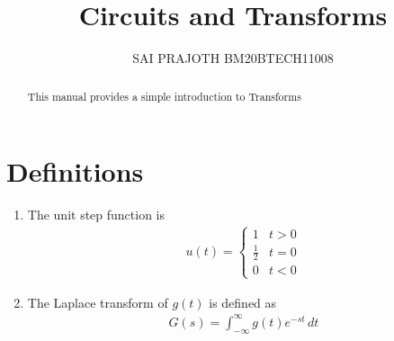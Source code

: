 \documentclass[journal,12pt,twocolumn]{IEEEtran}
\renewcommand\thesection{\arabic{section}}
\begin{document}
	\let\StandardTheFigure\thefigure
	\renewcommand{\thefigure}{\theproblem}
	\renewcommand{\thefigure}{\arabic{section}.\arabic{figure}}
	\makeatletter
	\makeatother
	
	
	\def\putbox#1#2#3{\makebox[0in][l]{\makebox[#1][l]{}\raisebox{\baselineskip}[0in][0in]{\raisebox{#2}[0in][0in]{#3}}}}
	\def\rightbox#1{\makebox[0in][r]{#1}}
	\def\centbox#1{\makebox[0in]{#1}}
	\def\topbox#1{\raisebox{-\baselineskip}[0in][0in]{#1}}
	\def\midbox#1{\raisebox{-0.5\baselineskip}[0in][0in]{#1}}
	
	\vspace{3cm}
	
	\title{ 
		Circuits and Transforms
	}
	
	\author{SAI PRAJOTH BM20BTECH11008}
	
	\maketitle
	
	
	\tableofcontents
	
	
	\renewcommand{\thefigure}{\theenumi}
	\renewcommand{\thetable}{\theenumi}
	
	
	
	\bigskip
	
	\begin{abstract}
		This manual provides a simple introduction to Transforms
	\end{abstract}
	
	\section{Definitions}
	\begin{enumerate}[label=\arabic*.,ref=\thesection.\theenumi]
		\item The unit step function is 
		\begin{align}
			u(t) =
			\begin{cases}
				1 & t > 0
				\\
				\frac{1}{2} & t = 0
				\\
				0 & t < 0
			\end{cases}
		\end{align}
		\item The Laplace transform of $g(t)$ is defined as 
		\begin{align}
			G(s) = \int_{-\infty}^{\infty} g(t) e^{-st}\, dt
		\end{align}
	\end{enumerate}
	
\end{document}
